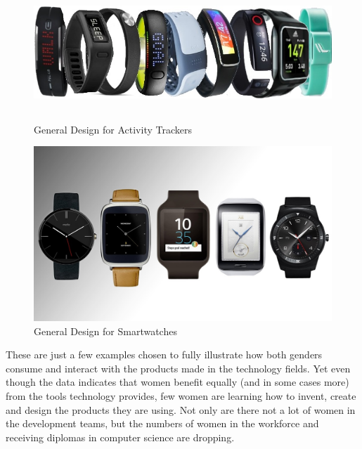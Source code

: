 \documentclass[12pt]{article}
\begin{document}
	 	\begin{figure}[H]
	 		\begin{center}
	 			\includegraphics[height = 2in, keepaspectratio]{ActivityTrackers}
	 			\caption{General Design for Activity Trackers}
		 	\end{center}
	 	\end{figure}	
	 	
	 	\begin{figure}[H]
	 		\begin{center}
	 			\includegraphics[width = \textwidth, keepaspectratio]{Smartwatch}
	 			\caption{General Design for  Smartwatches}
	 		\end{center}
	 	\end{figure}
	 
	These are just a few examples chosen to fully illustrate how both genders consume and interact with the products made in the technology fields. Yet even though the data indicates that women benefit equally (and in some cases more) from the tools technology provides, few women are learning how to invent, create and design the products they are using. Not only are there not a lot of women in the development teams, but the numbers of women in the workforce and receiving diplomas in computer science are dropping. \\
	
\end{document}
